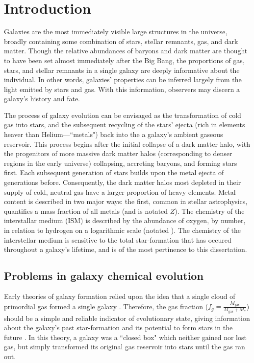 \graphicspath{{Chapter0-Introduction/}}
\chapter{Introduction}
\label{chap0:intro}

Galaxies are the most immediately visible large structures in the universe, broadly containing some combination of stars, stellar remnants, gas, and dark matter. Though the relative abundances of baryons and dark matter are thought to have been set almost immediately after the Big Bang, the proportions of gas, stars, and stellar remnants in a single galaxy are deeply informative about the individual. In other words, galaxies' properties can be inferred largely from the light emitted by stars and gas. With this information, observers may discern a galaxy's history and fate.

The process of galaxy evolution can be envisaged as the transformation of cold gas into stars, and the subsequent recycling of the stars' ejecta (rich in elements heaver than Helium---``metals") back into the a galaxy's ambient gaseous reservoir. This process begins after the initial collapse of a dark matter halo, with the progenitors of more massive dark matter halos (corresponding to denser regions in the early universe) collapsing, accreting baryons, and forming stars first. Each subsequent generation of stars builds upon the metal ejecta of generations before. Consequently, the dark matter halos most depleted in their supply of cold, neutral gas have a larger proportion of heavy elements. Metal content is described in two major ways: the first, common in stellar astrophysics, quantifies a mass fraction of all metals (and is notated $Z$). The chemistry of the interstallar medium (ISM) is described by the abundance of oxygen, by number, in relation to hydrogen on a logarithmic scale (notated \OonH). The chemistry of the interstellar medium is sensitive to the total star-formation that has occured throughout a galaxy's lifetime, and is of the most pertinence to this dissertation.

\section{Problems in galaxy chemical evolution}

Early theories of galaxy formation relied upon the idea that a single cloud of primordial gas formed a single galaxy \citep{eggen_62}. Therefore, the gas fraction ($f_g = \frac{M_{\textrm{gas}}}{M_{\textrm{gas}} + M_*}$) should be a simple and reliable indicator of evolutionary state, giving information about the galaxy's past star-formation and its potential to form stars in the future \citep{tinsley_80_chemev,pei_fall_95}. In this theory, a galaxy was a ``closed box" which neither gained nor lost gas, but simply transformed its original gas reservoir into stars until the gas ran out.

